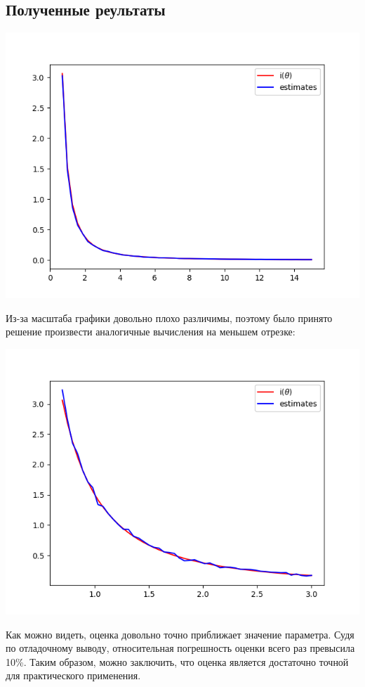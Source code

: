 \documentclass{article}
\begin{document}
    \subsection{Полученные реультаты}

    \includegraphics[scale=0.5]{plot_full}

    Из-за масштаба графики довольно плохо различимы, поэтому было принято решение произвести аналогичные вычисления на меньшем отрезке:

    \includegraphics[scale=0.5]{myplot}

    Как можно видеть, оценка довольно точно приближает значение параметра. Судя по отладочному выводу, относительная погрешность оценки всего раз превысила 10\%. Таким образом, можно заключить, что оценка является достаточно точной для практического применения.
\end{document}
